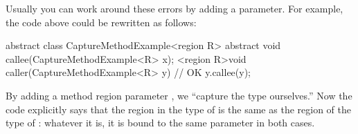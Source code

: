 Usually you can work around these errors by adding a parameter.  For
example, the code above could be rewritten as follows:
%
\begin{numbereddpjlisting}
abstract class CaptureMethodExample<region R> {
    abstract void callee(CaptureMethodExample<R> x);
    <region R>void caller(CaptureMethodExample<R> y) {
        // OK
        y.callee(y);
    }
}
\end{numbereddpjlisting}
%
By adding a method region parameter , we ``capture the type
ourselves.''  Now the code explicitly says that the region in the type
of  is the same as the region of the type of : whatever
it is, it is bound to the same parameter  in both cases.



